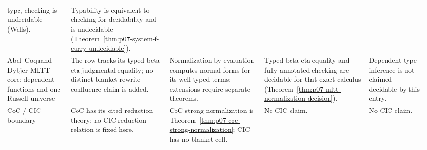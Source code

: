 \begin{landscape}
\begin{longtable}{@{}p{.95in}p{1.30in}p{1.45in}p{1.55in}p{1.55in}@{}}
type, checking is undecidable (Wells). & Typability is equivalent to checking
for decidability and is undecidable
(Theorem~\ref{thm:p07-system-f-curry-undecidable}). \\
Abel--Coquand--Dybjer MLTT core: dependent functions and one Russell universe &
The row tracks its typed beta-eta judgmental equality; no distinct blanket
rewrite-confluence claim is added. & Normalization by evaluation computes
normal forms for its well-typed terms; extensions require separate theorems. &
Typed beta-eta equality and fully annotated checking are decidable for that
exact calculus
(Theorem~\ref{thm:p07-mltt-normalization-decision}). & Dependent-type
inference is not claimed decidable by this entry. \\
CoC / CIC boundary & CoC has its cited reduction theory; no CIC reduction
relation is fixed here. & CoC strong normalization is
Theorem~\ref{thm:p07-coc-strong-normalization}; CIC has no blanket cell. & No
CIC claim. & No CIC claim. \\
\bottomrule
\end{longtable}
\endgroup
\end{landscape}

